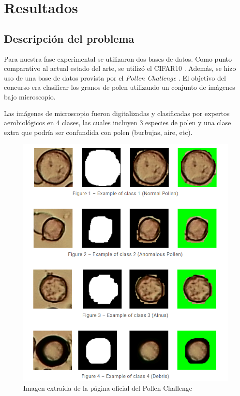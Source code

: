 
\chapter{Resultados} \label{experimentos}
\section{Descripción del problema}
Para nuestra fase experimental se utilizaron dos bases de datos. Como punto comparativo al actual estado del arte, se utilizó el CIFAR10 \cite{CIFAR}. Además, se hizo uso de una base de datos provista por el \textsl{Pollen Challenge} \cite{polen}. El objetivo del concurso era clasificar los granos de polen utilizando un  conjunto de imágenes bajo microscopio.

Las imágenes de microscopio fueron digitalizadas y clasificadas por expertos aerobiológicos en 4 clases, las cuales incluyen 3 especies de polen y una clase extra que podría ser confundida con polen (burbujas, aire, etc). 
\begin{figure}[H]
    \centering
    \includegraphics[width = 5in]{../cap5_experimentos/src/polen.png}
    \caption{Imagen extraída de la página oficial del Pollen Challenge \cite{polen}}
\end{figure}
